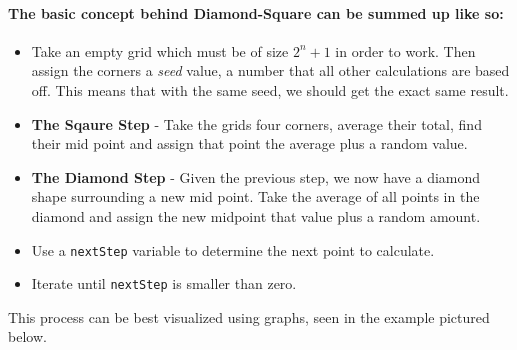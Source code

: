 \documentclass{article}
\begin{document}
\paragraph{The basic concept behind Diamond-Square can be summed up like so:}
	
\begin{itemize}

	\item
		Take an empty grid which must be of size \(2^{n}+1\) in order to work. Then assign the corners a \emph{seed} value, a number that all other calculations are based off. This means that with the same seed, we should get the exact same result.
	\item
		\textbf{The Sqaure Step} - Take the grids four corners, average their total, find their mid point and assign that point the average plus a random value.
	\item
		\textbf{The Diamond Step} - Given the previous step, we now have a diamond shape surrounding a new mid point. Take the average of all points in the diamond and assign the new midpoint that value plus a random amount.
	\item
		Use a \texttt{nextStep} variable to determine the next point to calculate. 
	\item
		Iterate until \texttt{nextStep} is smaller than zero.
		
\end{itemize}
	
This process can be best visualized using graphs, seen in the example pictured below.
	
\end{document}

